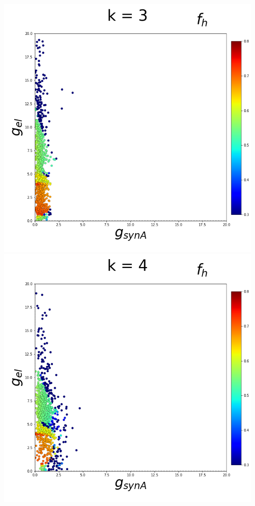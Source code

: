\documentclass[11pt]{article}
\begin{document}
\begin{center}
\includegraphics[scale=0.125]{DSN_figs/STGCircuit_DSN_c=2_rs=4_k=3.png}
\includegraphics[scale=0.125]{DSN_figs/STGCircuit_DSN_c=2_rs=4_k=4.png}

\end{center}
\end{document}

